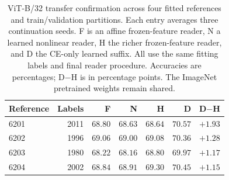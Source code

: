 \begin{table}[htbp]
\centering\small
\caption{ViT-B/32 transfer confirmation across four fitted references and
train/validation partitions. Each entry averages three continuation seeds.
F is an affine frozen-feature reader, N a learned nonlinear reader, H the
richer frozen-feature reader, and D the CE-only learned suffix. All use the
same fitting labels and final reader procedure. Accuracies are percentages; D$-$H is in percentage points. The ImageNet pretrained weights remain shared.}
\label{tab:reference_replication}
\begin{tabular}{lrrrrrr}\toprule
Reference & Labels & F & N & H & D & D$-$H \\
\midrule
6201 & 2011 & $68.80$ & $68.63$ & $68.64$ & $70.57$ & $+1.93$ \\
6202 & 1996 & $69.06$ & $69.00$ & $69.08$ & $70.36$ & $+1.28$ \\
6203 & 1980 & $68.22$ & $68.16$ & $68.80$ & $69.97$ & $+1.17$ \\
6204 & 2002 & $68.84$ & $68.91$ & $69.30$ & $70.45$ & $+1.15$ \\
\bottomrule\end{tabular}
\end{table}
